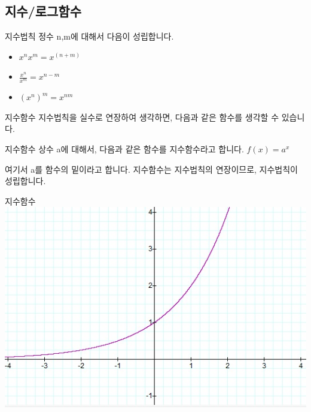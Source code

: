 \documentclass{beamer}
\begin{document}
\subsection{지수/로그함수} 

\begin{frame}{지수법칙}
정수 n,m에 대해서 다음이 성립합니다. 

\begin{itemize}
\item $x^n x^m = x^(n+m)$
\item $\frac{x^n}{x^m} = x^{n-m}$
\item $(x^n)^m = x^{nm}$
\end{itemize}
\end{frame}


\begin{frame}{지수함수}
지수법칙을 실수로 연장하여 생각하면, 다음과 같은 함수를 생각할 수 있습니다. 
\begin{block}{지수함수}
상수 a에 대해서, 다음과 같은 함수를 지수함수라고 합니다. $f(x) = a^x$

\end{block}
여기서 a를 함수의 밑이라고 합니다. 지수함수는 지수법칙의 연장이므로, 지수법칙이 성립합니다. 
\end{frame}

\begin{frame}{지수함수}
\includegraphics[width=\textwidth]{exp}
\end{frame}
\end{document}
